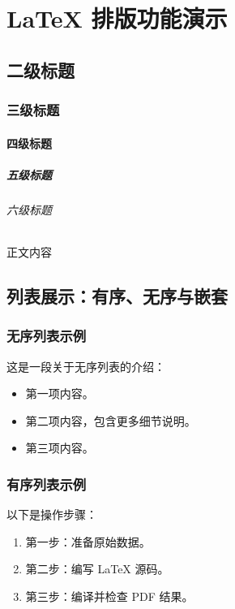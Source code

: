 \chapter{LaTeX 排版功能演示}\label{ch:example}

\section{二级标题}
\subsection{三级标题}
\subsubsection{四级标题}
\paragraph{五级标题}
\subparagraph{六级标题}
正文内容

\section{列表展示：有序、无序与嵌套}

\subsection{无序列表示例}
这是一段关于无序列表的介绍：
\begin{itemize}
  \item 第一项内容。
  \item 第二项内容，包含更多细节说明。
  \item 第三项内容。
\end{itemize}

\subsection{有序列表示例}
以下是操作步骤：
\begin{enumerate}
  \item 第一步：准备原始数据。
  \item 第二步：编写 LaTeX 源码。
  \item 第三步：编译并检查 PDF 结果。
\end{enumerate}

